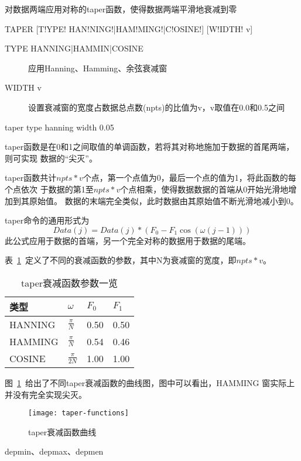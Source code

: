 \label{cmd:taper}

对数据两端应用对称的taper函数，使得数据两端平滑地衰减到零

\begin{SACSTX}
TAPER [T!YPE! HAN!NING!|HAM!MING!|C!OSINE!] [W!IDTH! v]
\end{SACSTX}

\begin{description}
\item [TYPE HANNING|HAMMIN|COSINE] 应用Hanning、Hamming、余弦衰减窗
\item [WIDTH v] 设置衰减窗的宽度占数据总点数(npts)的比值为v，v取值在0.0和0.5之间
\end{description}

\begin{SACDFT}
taper type hanning width 0.05
\end{SACDFT}

taper函数是在0和1之间取值的单调函数，若将其对称地施加于数据的首尾两端，则可实现
数据的``尖灭''。

taper函数共计$npts*v$个点，第一个点值为0，最后一个点的值为1，将此函数的每个点依次
于数据的第1至$npts*v$个点相乘，使得数据数据的首端从0开始光滑地增加到其原始值。
数据的末端完全类似，此时数据由其原始值不断光滑地减小到0。

taper命令的通用形式为
\[
    Data(j) = Data(j)*(F_0 - F_1\cos(\omega(j-1)))
\]
此公式应用于数据的首端，另一个完全对称的数据用于数据的尾端。

表~\ref{table:taper-functions}~定义了不同的衰减函数的参数，其中N为衰减窗的宽度，即$npts*v$。
\begin{table}[ht]
\centering
\caption{taper衰减函数参数一览}
\label{table:taper-functions}
\begin{tabular}{llll}
\toprule
类型 & $\omega$ & $F_0$	& $F_1$	\\
\midrule
HANNING	&	$\frac{\pi}{N}$	&	0.50	&	0.50	\\
HAMMING	&	$\frac{\pi}{N}$	&	0.54	&	0.46	\\
COSINE	&	$\frac{\pi}{2N}$	&	1.00	&	1.00	\\
\bottomrule
\end{tabular}
\end{table}

图~\ref{fig:taper-functions}~给出了不同taper衰减函数的曲线图，图中可以看出，HAMMING
窗实际上并没有完全实现尖灭。
\begin{figure}[!ht]
\centering
\texttt{[image: taper-functions]}
\caption{taper衰减函数曲线}
\label{fig:taper-functions}
\end{figure}

depmin、depmax、depmen

